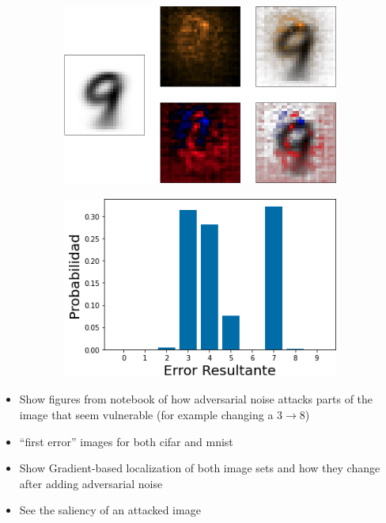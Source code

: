 \begin{figure}[h!]
    \centering
    \begin{subfigure}[b]{0.47\textwidth}
        \centering
        \includegraphics[width=\textwidth]{images/saliency/mnist/nonlinear/9_saliency_figures.png}
        \caption{}
        \label{9_saliency_nonlin}
    \end{subfigure}
    \hfill
    \begin{subfigure}[b]{0.47\textwidth}
        \centering
        \includegraphics[width=\textwidth]{images/saliency/mnist/nonlinear/9_error.png}
        \caption{}
        \label{9_error_nonlin}
    \end{subfigure}
    \caption{}
    \label{9_SAL_NONLIN}
\end{figure}


\begin{itemize}
    \item Show figures from notebook of how adversarial noise attacks parts of the image that seem vulnerable (for example changing a 3$\to$8)
    \item ``first error'' images for both cifar and mnist
    \item Show Gradient-based localization of both image sets and how they change after adding adversarial noise\cite{Selvaraju_2019}
    \item See the saliency of an attacked image
\end{itemize}